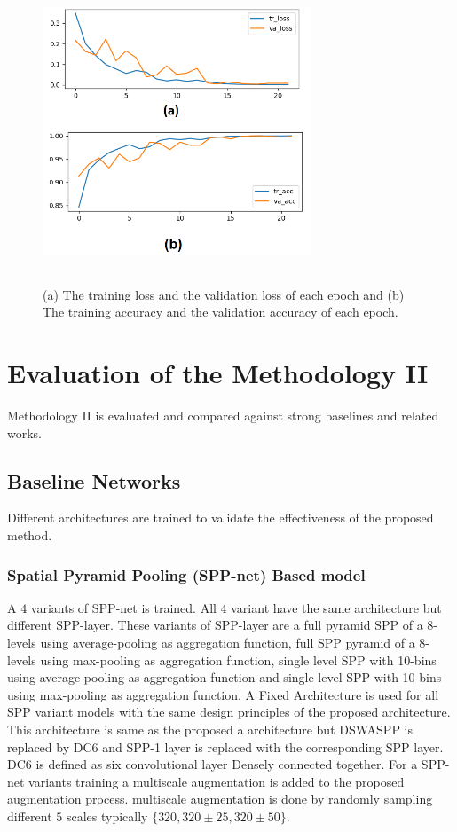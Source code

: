 \begin{figure}
\begin{center}
\includegraphics[height=90mm,width=8.0cm]{Figures/fig6.png}
\caption{(a) The training loss and the validation loss of each epoch and (b) The training accuracy and the validation accuracy of each epoch.}\label{fig5}\end{center}\end{figure}



\section{Evaluation of the Methodology II}
Methodology II is evaluated and compared against strong baselines and related works. 

\subsection{Baseline Networks}
Different architectures are trained to validate the effectiveness of the proposed method. 
\subsubsection{Spatial Pyramid Pooling (SPP-net) Based model}
A $4$ variants of SPP-net\cite{he2015spatial} is trained. All $4$ variant have the same architecture but different SPP-layer. These variants of SPP-layer are a full pyramid SPP of a 8-levels using average-pooling as aggregation function, full SPP pyramid of a 8-levels using max-pooling as aggregation function, single level SPP with 10-bins using average-pooling as aggregation function and single level SPP with 10-bins using max-pooling as aggregation function. A Fixed Architecture is used for all SPP variant models with the same design principles of the proposed architecture. This architecture is same as the proposed a architecture but DSWASPP is replaced by DC6 and SPP-1 layer is replaced with the corresponding SPP layer. DC6 is defined as six convolutional layer Densely connected together. For a SPP-net variants training a multiscale augmentation is added to the proposed augmentation process. multiscale augmentation is done by randomly sampling different $5$ scales typically $\{320, 320\pm25, 320\pm50 \}$.
